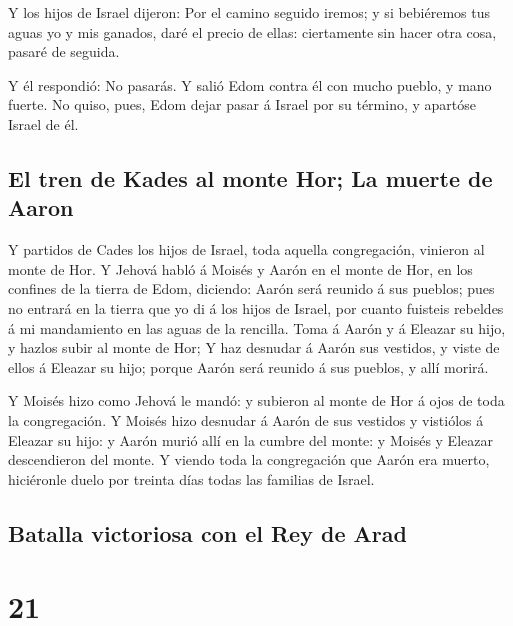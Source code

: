  Y los hijos de Israel dijeron: Por el camino seguido
iremos; y si bebiéremos tus aguas yo y mis ganados, daré el precio de
ellas: ciertamente sin hacer otra cosa, pasaré de seguida.

 Y él respondió: No pasarás. Y salió Edom contra él con
mucho pueblo, y mano fuerte.  No quiso, pues, Edom dejar
pasar á Israel por su término, y apartóse Israel de él.

\hypertarget{el-tren-de-kades-al-monte-hor-la-muerte-de-aaron}{%
\subsection{El tren de Kades al monte Hor; La muerte de
Aaron}\label{el-tren-de-kades-al-monte-hor-la-muerte-de-aaron}}

 Y partidos de Cades los hijos de Israel, toda aquella
congregación, vinieron al monte de Hor.  Y Jehová habló á
Moisés y Aarón en el monte de Hor, en los confines de la tierra de Edom,
diciendo:  Aarón será reunido á sus pueblos; pues no
entrará en la tierra que yo di á los hijos de Israel, por cuanto
fuisteis rebeldes á mi mandamiento en las aguas de la rencilla.
 Toma á Aarón y á Eleazar su hijo, y hazlos subir al monte
de Hor;  Y haz desnudar á Aarón sus vestidos, y viste de
ellos á Eleazar su hijo; porque Aarón será reunido á sus pueblos, y allí
morirá.

 Y Moisés hizo como Jehová le mandó: y subieron al monte de
Hor á ojos de toda la congregación.  Y Moisés hizo desnudar
á Aarón de sus vestidos y vistiólos á Eleazar su hijo: y Aarón murió
allí en la cumbre del monte: y Moisés y Eleazar descendieron del monte.
 Y viendo toda la congregación que Aarón era muerto,
hiciéronle duelo por treinta días todas las familias de Israel.

\hypertarget{batalla-victoriosa-con-el-rey-de-arad}{%
\subsection{Batalla victoriosa con el Rey de
Arad}\label{batalla-victoriosa-con-el-rey-de-arad}}

\hypertarget{section-20}{%
\section{21}\label{section-20}}

